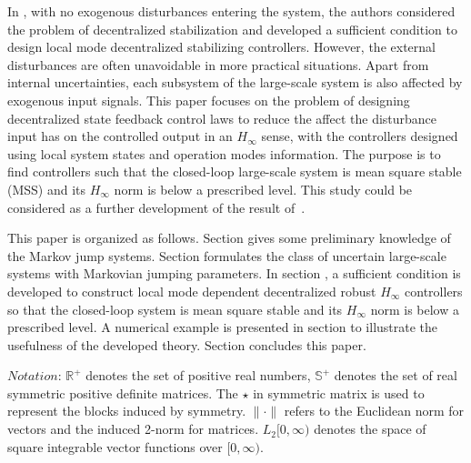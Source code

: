 \documentclass[11pt,draftcls,onecolumn]{IEEEtran}
\begin{document}
 In \cite{Xiong2009}, with no exogenous disturbances entering the system, the authors considered the problem of decentralized stabilization and developed a sufficient condition to design local mode decentralized stabilizing controllers. However, the external
disturbances are often unavoidable in more practical situations. Apart from internal uncertainties, each subsystem of the large-scale system is also affected by exogenous input signals.  This paper focuses on the problem of designing decentralized state feedback control laws to reduce the affect the disturbance input has on the controlled output in an $H_{\infty}$ sense, with the controllers designed using local system states and operation modes information.  The purpose is to find controllers such that  the closed-loop large-scale system is  mean square stable (MSS) and  its $H_{\infty}$ norm is below a prescribed level. This study could be considered as a further development of the result of~\cite{Xiong2009}.





This paper is organized as follows. Section \uppercase\expandafter{} gives some preliminary knowledge of the Markov jump systems. Section \uppercase\expandafter{} formulates the class of uncertain large-scale systems with Markovian jumping parameters.  In section \uppercase\expandafter{}, a sufficient condition is developed to construct local mode dependent decentralized robust $H_\infty$ controllers so that the closed-loop system is mean square stable  and its $H_{\infty}$ norm is below a prescribed level.
 A numerical example is presented in section \uppercase\expandafter{} to illustrate the usefulness of the developed theory. Section \uppercase\expandafter{} concludes this paper.

$Notation$: $\mathbb{R}^{+}$ denotes the set of positive real numbers, $\mathbb{S}^{+}$ denotes the set of real symmetric positive definite matrices. The $\star$ in symmetric matrix is used to represent the blocks induced by symmetry.   $ \|\cdot\|$ refers to the Euclidean norm for vectors and the induced 2-norm for matrices.  $L_2[0,\infty)$ denotes the space of square integrable vector functions  over $[0,\infty)$.
\end{document}
